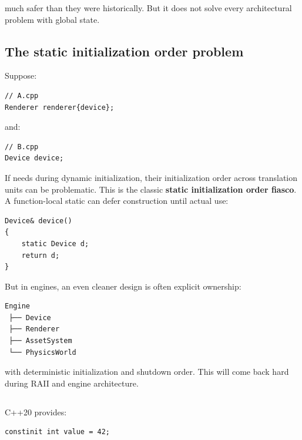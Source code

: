 much safer than they were historically. But it does not solve every architectural problem with global state.

\subsection{The static initialization order problem}\label{05-engine-i-ch002-the-static-initialization-order-problem}

\hypertarget{05-engine-i-ch002-the-static-initialization-order-problem}{}

Suppose:

\begin{verbatim}
// A.cpp
Renderer renderer{device};
\end{verbatim}

and:

\begin{verbatim}
// B.cpp
Device device;
\end{verbatim}

If  needs  during dynamic initialization, their initialization order across translation units can be problematic. This is the classic \textbf{static initialization order fiasco}. A function-local static can defer construction until actual use:

\begin{verbatim}
Device& device()
{
    static Device d;
    return d;
}
\end{verbatim}

But in engines, an even cleaner design is often explicit ownership:

\begin{verbatim}
Engine
 ├── Device
 ├── Renderer
 ├── AssetSystem
 └── PhysicsWorld
\end{verbatim}

with deterministic initialization and shutdown order. This will come back hard during RAII and engine architecture.

\subsection{\texorpdfstring{}{constinit}}\label{05-engine-i-ch002-constinit}

\hypertarget{05-engine-i-ch002-constinit}{}

C++20 provides:

\begin{verbatim}
constinit int value = 42;
\end{verbatim}


